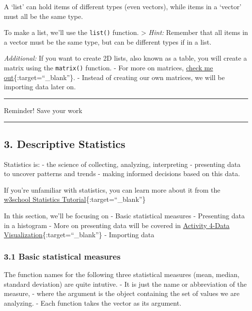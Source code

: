 \documentclass[
]{article}
\begin{document}
A `list' can hold items of different types (even vectors), while items
in a `vector' must all be the same type.

To make a list, we'll use the \texttt{list()} function. \textgreater{}
\emph{Hint:} Remember that all items in a vector must be the same type,
but can be different types if in a list.

\emph{Additional:} If you want to create 2D lists, also known as a
table, you will create a matrix using the \texttt{matrix()} function. -
For more on matrices,
\href{https://www.w3schools.com/r/r_matrices.asp}{check me
out}\{:target=``\_blank''\}. - Instead of creating our own matrices, we
will be importing data later on.

\begin{center}\rule{0.5\linewidth}{0.5pt}\end{center}

Reminder! Save your work

\begin{center}\rule{0.5\linewidth}{0.5pt}\end{center}

\hypertarget{descriptive-statistics}{%
\subsection{3. Descriptive Statistics}\label{descriptive-statistics}}

Statistics is: - the science of collecting, analyzing, interpreting -
presenting data to uncover patterns and trends - making informed
decisions based on this data.

If you're unfamiliar with statistics, you can learn more about it from
the \href{https://www.w3schools.com/statistics/index.php}{w3school
Statistics Tutorial}\{:target=``\_blank''\}

In this section, we'll be focusing on - Basic statistical measures -
Presenting data in a histogram - More on presenting data will be covered
in
\href{https://uviclibraries.github.io/rstudio/ggplot2-data.html}{Activity
4-Data Visualization}\{:target=``\_blank''\} - Importing data

\hypertarget{basic-statistical-measures}{%
\subsubsection{3.1 Basic statistical
measures}\label{basic-statistical-measures}}

The function names for the following three statistical measures (mean,
median, standard deviation) are quite intutive. - It is just the name or
abbreviation of the measure, - where the argument is the object
containing the set of values we are analyzing. - Each function takes the
vector as its argument.
\end{document}
